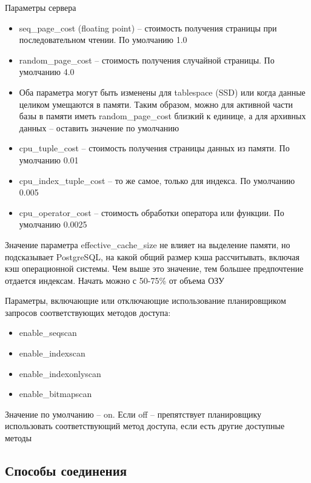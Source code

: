 \documentclass[12pt]{article}
\begin{document}
\begin{nota}{Параметры сервера}
    \begin{itemize}
        \item seq\_page\_cost (floating point) -- стоимость получения страницы при последовательном чтении. По умолчанию 1.0
        \item random\_page\_cost -- стоимость получения случайной страницы. По умолчанию 4.0
        \item Оба параметра могут быть изменены для tablespace (SSD) или когда данные целиком умещаются в памяти. Таким образом, можно для активной части базы в памяти иметь random\_page\_cost близкий к единице, а для архивных данных -- оставить значение по умолчанию 
        \item cpu\_tuple\_cost -- стоимость получения страницы данных из памяти. По умолчанию 0.01
        \item cpu\_index\_tuple\_cost -- то же самое, только для индекса. По умолчанию 0.005
        \item cpu\_operator\_cost -- стоимость обработки оператора или функции. По умолчанию 0.0025
    \end{itemize}

    Значение параметра effective\_cache\_size не влияет на выделение памяти, но подсказывает PostgreSQL, на какой общий размер кэша рассчитывать, включая кэш операционной системы. Чем выше это значение, тем большее предпочтение отдается индексам. Начать можно с 50-75\% от объема ОЗУ

    Параметры, включающие или отключающие использование планировщиком запросов соответствующих методов доступа:

    \begin{itemize}
        \item enable\_seqscan 
        \item enable\_indexscan
        \item enable\_indexonlyscan
        \item enable\_bitmapscan
    \end{itemize}

    Значение по умолчанию -- on. Если off -- препятствует планировщику использовать соответствующий метод доступа, если есть другие доступные методы 
\end{nota}

\newpage 

\subsection{Способы соединения}
\end{document}
